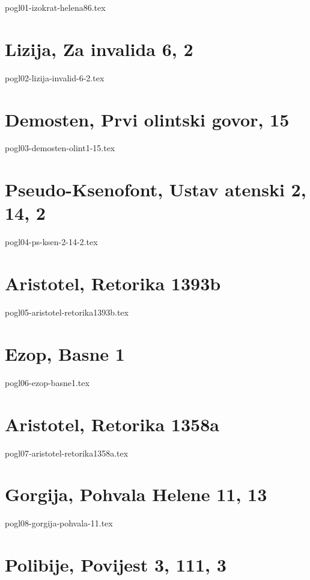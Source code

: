 \documentclass[a4paper,12pt,twoside]{report}
\begin{document}
{pogl01-izokrat-helena86.tex}

\chapter{Lizija, Za invalida 6, 2}

{pogl02-lizija-invalid-6-2.tex}

\chapter{Demosten, Prvi olintski govor, 15}

{pogl03-demosten-olint1-15.tex}

\chapter{Pseudo-Ksenofont, Ustav atenski 2, 14, 2}

{pogl04-ps-ksen-2-14-2.tex}

\chapter{Aristotel, Retorika 1393b}

{pogl05-aristotel-retorika1393b.tex}

\chapter{Ezop, Basne 1}

{pogl06-ezop-basne1.tex}

\chapter{Aristotel, Retorika 1358a}

{pogl07-aristotel-retorika1358a.tex}

\chapter{Gorgija, Pohvala Helene 11, 13}

{pogl08-gorgija-pohvala-11.tex}

\chapter{Polibije, Povijest 3, 111, 3}
\end{document}
